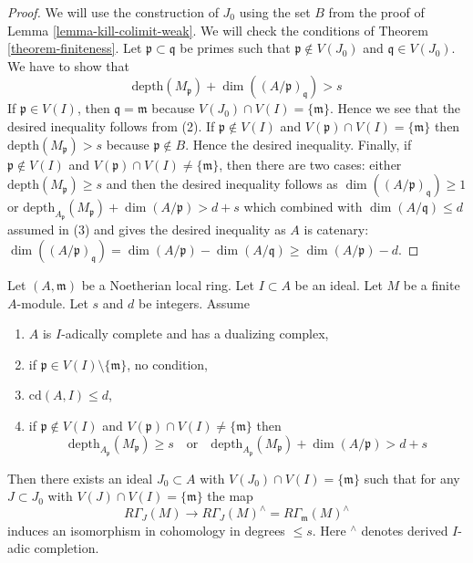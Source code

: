 \begin{proof}
We will use the construction of $J_0$ using the set $B$ from
the proof of Lemma \ref{lemma-kill-colimit-weak}.
We will check the conditions of Theorem \ref{theorem-finiteness}.
Let $\mathfrak p \subset \mathfrak q$ be primes
such that $\mathfrak p \not \in V(J_0)$ and
$\mathfrak q \in V(J_0)$. We have to show that
$$
\text{depth}(M_\mathfrak p) + \dim((A/\mathfrak p)_\mathfrak q) > s
$$
If $\mathfrak p \in V(I)$, then $\mathfrak q = \mathfrak m$ because
$V(J_0) \cap V(I) = \{\mathfrak m\}$. Hence we see that the desired
inequality follows from (2).
If $\mathfrak p \not \in V(I)$ and $V(\mathfrak p) \cap V(I) = \{\mathfrak m\}$
then $\text{depth}(M_\mathfrak p) > s$ because
$\mathfrak p \not \in B$. Hence the desired inequality.
Finally, if $\mathfrak p \not \in V(I)$ and
$V(\mathfrak p) \cap V(I) \not = \{\mathfrak m\}$, then
there are two cases: either $\text{depth}(M_\mathfrak p) \geq s$
and then the desired inequality follows as
$\dim((A/\mathfrak p)_\mathfrak q) \geq 1$ or
$\text{depth}_{A_\mathfrak p}(M_\mathfrak p) + \dim(A/\mathfrak p) > d + s$
which combined with $\dim(A/\mathfrak q) \leq d$ assumed in (3)
and gives the desired inequality as $A$ is catenary:
$\dim((A/\mathfrak p)_\mathfrak q) = \dim(A/\mathfrak p) - \dim(A/\mathfrak q)
\geq \dim(A/\mathfrak p) - d$.
\end{proof}

\begin{lemma}
\label{lemma-algebraize-local-cohomology}
Let $(A, \mathfrak m)$ be a Noetherian local ring.
Let $I \subset A$ be an ideal. Let $M$ be a finite $A$-module.
Let $s$ and $d$ be integers. Assume
\begin{enumerate}
\item $A$ is $I$-adically complete and has a dualizing complex,
\item if $\mathfrak p \in V(I) \setminus \{\mathfrak m\}$, no condition,
\item $\text{cd}(A, I) \leq d$,
\item if $\mathfrak p \not \in V(I)$ and
$V(\mathfrak p) \cap V(I) \not = \{\mathfrak m\}$ then
$$
\text{depth}_{A_\mathfrak p}(M_\mathfrak p) \geq s
\quad\text{or}\quad
\text{depth}_{A_\mathfrak p}(M_\mathfrak p) + \dim(A/\mathfrak p) > d + s
$$
\end{enumerate}
Then there exists an ideal $J_0 \subset A$ with
$V(J_0) \cap V(I) = \{\mathfrak m\}$ such that for any $J \subset J_0$ with
$V(J) \cap V(I) = \{\mathfrak m\}$ the map
$$
R\Gamma_J(M) \longrightarrow
R\Gamma_J(M)^\wedge = R\Gamma_\mathfrak m(M)^\wedge
$$
induces an isomorphism in cohomology in degrees $\leq s$.
Here ${}^\wedge$ denotes derived $I$-adic completion.
\end{lemma}


